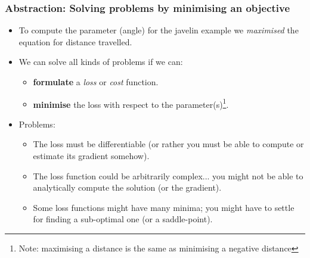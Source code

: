 \documentclass[\beamerclass]{beamer}
\begin{document}
\begin{frame}
\frametitle{Abstraction: Solving problems by minimising an objective}

\begin{itemize}
	\item<+-> To compute the parameter (angle) for the javelin example we \emph{maximised} the equation for distance travelled.
	\item<+-> We can solve all kinds of problems if we can:
	\begin{itemize}
	 	\item \textbf{formulate} a \emph{loss} or \emph{cost} function.
	 	\item<+-> \textbf{minimise} the loss with respect to the parameter(s)\footnote{Note: maximising a distance is the same as minimising a negative distance}.
	 \end{itemize} 
	 \item<+-> Problems:
	 \begin{itemize}
	 	\item The loss must be differentiable (or rather you must be able to compute or estimate its gradient somehow).
	 	\item The loss function could be arbitrarily complex... you might not be able to analytically compute the solution (or the gradient).
	 	\item Some loss functions might have many minima; you might have to settle for finding a sub-optimal one (or a saddle-point).
	 \end{itemize}
\end{itemize}

\end{frame}
\end{document}
